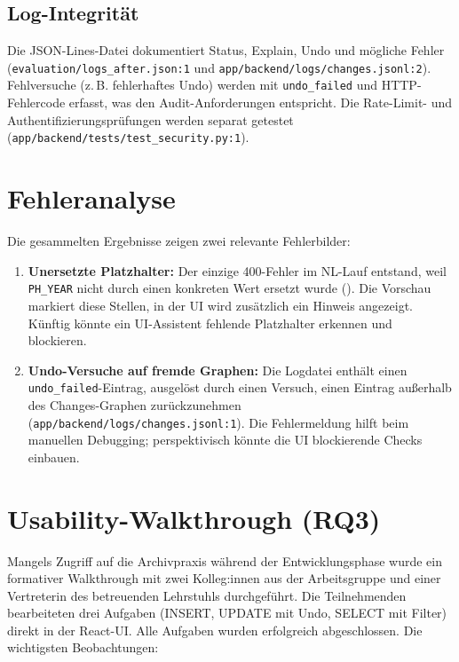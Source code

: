 \subsection{Log-Integrität}
Die JSON-Lines-Datei dokumentiert Status, Explain, Undo und mögliche Fehler (\texttt{evaluation/logs\_after.json:1} und \texttt{app/backend/logs/changes.jsonl:2}). Fehlversuche (z.\,B. fehlerhaftes Undo) werden mit \texttt{undo\_failed} und HTTP-Fehlercode erfasst, was den Audit-Anforderungen entspricht. Die Rate-Limit- und Authentifizierungsprüfungen werden separat getestet (\texttt{app/backend/tests/test\_security.py:1}).

\section{Fehleranalyse}

Die gesammelten Ergebnisse zeigen zwei relevante Fehlerbilder:
\begin{enumerate}
  \item \textbf{Unersetzte Platzhalter:} Der einzige 400-Fehler im NL-Lauf entstand, weil \texttt{PH\_YEAR} nicht durch einen konkreten Wert ersetzt wurde (). Die Vorschau markiert diese Stellen, in der UI wird zusätzlich ein Hinweis angezeigt. Künftig könnte ein UI-Assistent fehlende Platzhalter erkennen und blockieren.
  \item \textbf{Undo-Versuche auf fremde Graphen:} Die Logdatei enthält einen \texttt{undo\_failed}-Eintrag, ausgelöst durch einen Versuch, einen Eintrag außerhalb des Changes-Graphen zurückzunehmen (\texttt{app/backend/logs/changes.jsonl:1}). Die Fehlermeldung hilft beim manuellen Debugging; perspektivisch könnte die UI blockierende Checks einbauen.
\end{enumerate}

\section{Usability-Walkthrough (RQ3)}

Mangels Zugriff auf die Archivpraxis während der Entwicklungsphase wurde ein formativer Walkthrough mit zwei Kolleg:innen aus der Arbeitsgruppe und einer Vertreterin des betreuenden Lehrstuhls durchgeführt. Die Teilnehmenden bearbeiteten drei Aufgaben (INSERT, UPDATE mit Undo, SELECT mit Filter) direkt in der React-UI. Alle Aufgaben wurden erfolgreich abgeschlossen. Die wichtigsten Beobachtungen:

